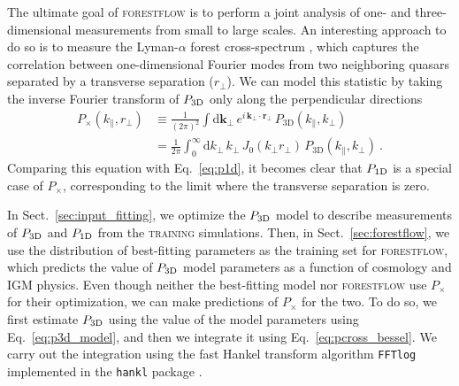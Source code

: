 \documentclass[longauth]{aa}
\newcommand{\lyaf}{Lyman-$\alpha$ forest\xspace}
\newcommand{\pcross}{$P_{\times}$\xspace}
\newcommand{\poned}{\ensuremath{P_{\rm 1D}}\xspace}
\newcommand{\pthreed}{\ensuremath{P_{\rm 3D}}\xspace}
\newcommand{\forestflow}{\textsc{forestflow}\xspace}
\newcommand{\lacehc}{\textsc{training}\xspace}
\begin{document}
The ultimate goal of \forestflow is to perform a joint analysis of one- and three-dimensional measurements from small to large scales. An interesting approach to do so is to measure the \lyaf cross-spectrum \citep[\pcross; e.g.,][]{hui1999GeometricalTestCosmological, fontribera2018HowEstimate3D}, which captures the correlation between one-dimensional Fourier modes from two neighboring quasars separated by a transverse separation ($r_\perp$). We can model this statistic by taking the inverse Fourier transform of \pthreed only along the perpendicular directions
%
\begin{align}
    P_{\times}(k_{\parallel}, r_\perp) &\equiv \frac{1}{(2\pi)^2}\int \mathrm{d}\boldsymbol{k}_\perp \, e^{i\,\boldsymbol{k}_\perp\cdot \boldsymbol{r}_\perp} \, P_\mathrm{3D}(k_\parallel, k_\perp) \nonumber\\ 
    &= \frac{1}{2\pi} \int_0^{\infty}  \mathrm{d}k_\perp\,  k_\perp\, J_0 (k_\perp r_\perp) \, P_\mathrm{3D}(k_\parallel, k_\perp) ~. \label{eq:pcross_bessel}
\end{align}
%
Comparing this equation with Eq.~\ref{eq:p1d}, it becomes clear that \poned is a special case of \pcross, corresponding to the limit where the transverse separation is zero.

In Sect.~\ref{sec:input_fitting}, we optimize the \pthreed model to describe measurements of \pthreed and \poned from the \lacehc simulations. Then, in Sect.~\ref{sec:forestflow}, we use the distribution of best-fitting parameters as the training set for \forestflow, which predicts the value of \pthreed model parameters as a function of cosmology and IGM physics. Even though neither the best-fitting model nor \forestflow use \pcross for their optimization, we can make predictions of \pcross for the two. To do so, we first estimate \pthreed using the value of the model parameters using Eq.~\ref{eq:p3d_model}, and then we integrate it using Eq.~\ref{eq:pcross_bessel}. We carry out the integration using the fast Hankel transform algorithm \texttt{FFTlog} \citep{Hamilton2000MNRAS.312..257H} implemented in the \texttt{hankl} package \citep{karamanis2021hankl}.
\end{document}
